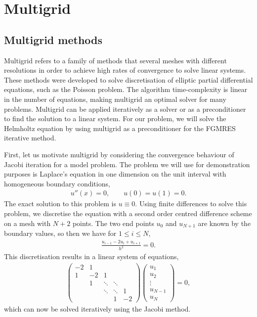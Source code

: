 \chapter{Multigrid}
\label{sec:mg}


\section{Multigrid methods}

Multigrid refers to a family of methods that several meshes with different resolutions in order to achieve high rates of convergence to solve linear systems.
These methods were developed to solve discretisation of elliptic partial differential equations, such as the Poisson problem.
The algorithm time-complexity is linear in the number of equations, making multigrid an optimal solver for many problems.
Multigrid can be applied iteratively as a solver or as a preconditioner to find the solution to a linear system.
For our problem, we will solve the Helmholtz equation by using multigrid as a preconditioner for the FGMRES iterative method.

First, let us motivate multigrid by considering the convergence behaviour of Jacobi iteration for a model problem.
The problem we will use for demonstration purposes is Laplace's equation in one dimension on the unit interval with homogeneous boundary conditions,
\begin{align}
	u''(x) = 0, \qquad u(0)=u(1)=0.
\end{align}
The exact solution to this problem is $u\equiv 0$.
Using finite differences to solve this problem, we discretise the equation with a second order centred difference scheme on a mesh with $N+2$ points.
The two end points $u_0$ and $u_{N+1}$ are known by the boundary values, so then we have for $1 \leq i \leq N$,
\begin{align}
	\frac{u_{i-1} - 2u_i + u_{i+1}}{h^2} = 0.
\end{align}
This discretisation results in a linear system of equations,
\begin{align}
	\begin{pmatrix}
		-2 	& 	1 	& & \\
		1	&	-2	&	1	& \\
		& 1 & \ddots & \ddots & \\
		 && \ddots & \ddots & 1 \\
		&&&1&-2
	\end{pmatrix} \begin{pmatrix}
		u_1 \\ u_2 \\ \vdots \\ u_{N-1} \\ u_N
	\end{pmatrix} = 0,
\end{align} 
which can now be solved iteratively using the Jacobi method.

